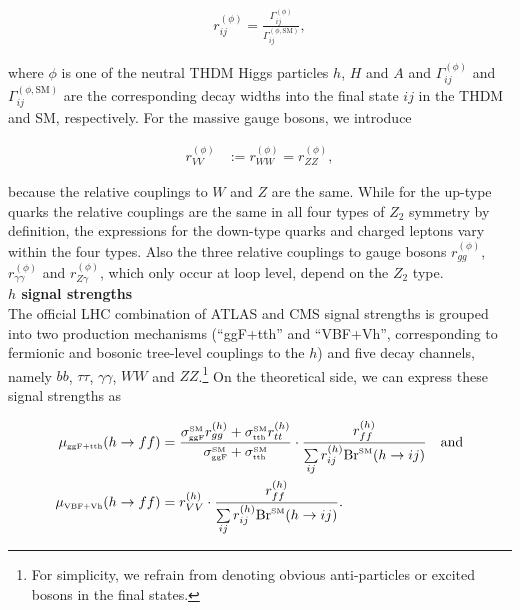 \documentclass[preprint,3p,12pt]{elsarticle}
\begin{document}
\begin{align}
 r_{ij}^{(\phi)}=\frac{\Gamma_{ij}^{(\phi)}}{\Gamma_{ij}^{(\phi,\text{SM})}}, \nonumber
\end{align}

where $\phi$ is one of the neutral THDM Higgs particles $h$, $H$ and $A$ and $\Gamma_{ij}^{(\phi)}$ and $\Gamma_{ij}^{(\phi,\text{SM})}$ are the corresponding decay widths into the final state $ij$ in the THDM and SM, respectively. For the massive gauge bosons, we introduce

\begin{align}
 r_{VV}^{(\phi)}&:=r_{WW}^{(\phi)}=r_{ZZ}^{(\phi)}, \nonumber
\end{align}

because the relative couplings to $W$ and $Z$ are the same. While for the up-type quarks the relative couplings are the same in all four types of $Z_2$ symmetry by definition, the expressions for the down-type quarks and charged leptons vary within the four types. Also the three relative couplings to gauge bosons $r_{gg}^{(\phi)}$, $r_{\gamma \gamma}^{(\phi)}$ and $r_{Z\gamma}^{(\phi)}$, which only occur at loop level, depend on the $Z_2$ type.\\

\textbf{$h$ signal strengths}\\

The official LHC combination of ATLAS and CMS signal strengths is grouped into two production mechanisms (``ggF+tth'' and ``VBF+Vh'', corresponding to fermionic and bosonic tree-level couplings to the $h$) and five decay channels, namely $bb$, $\tau \tau$, $\gamma \gamma$, $WW$ and $ZZ$.\footnote{For simplicity, we refrain from denoting obvious anti-particles or excited bosons in the final states.}
On the theoretical side, we can express these signal strengths as

\begin{align}
 \mu_{\text{\tiny{ggF+tth}}}(h\to ff) &= \frac{\sigma^{\text{\tiny{SM}}}_{\text{\tiny{ggF}}} r_{gg}^{(h)} + \sigma^{\text{\tiny{SM}}}_{\text{\tiny{tth}}} r_{tt}^{(h)}}{\sigma^{\text{\tiny{SM}}}_{\text{\tiny{ggF}}} + \sigma^{\text{\tiny{SM}}}_{\text{\tiny{tth}}}} \cdot \frac{r_{ff}^{(h)}}{\sum\limits_{ij} r_{ij}^{(h)} {\rm Br}^{\text{\tiny{SM}}} (h\to ij)} \quad \text{and}  \nonumber\\
 \mu_{\text{\tiny{VBF+Vh}}}(h\to ff) &= r_{VV}^{(h)} \cdot \frac{r_{ff}^{(h)}}{\sum\limits_{ij} r_{ij}^{(h)} {\rm Br}^{\text{\tiny{SM}}} (h\to ij)}. \nonumber
\end{align}
\end{document}
